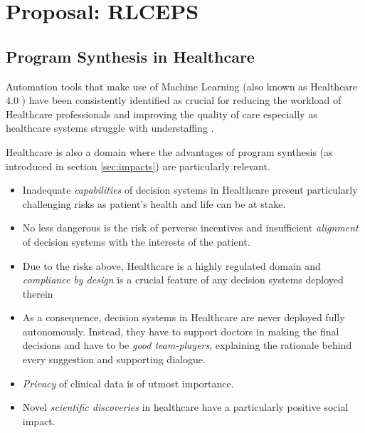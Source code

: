 \chapter{Proposal: RLCEPS}
\label{ch:proposal}

\section{Program Synthesis in Healthcare}
\label{sec:ps-health}

Automation tools that make use of Machine Learning (also known as Healthcare 4.0 \cite{tortorellaHealthcareTrendsChallenges2020}) have been consistently identified as crucial for reducing the workload of Healthcare professionals and improving the quality of care \cite{agrawalMachineLearningHealthcare2020, deviDesignImplementationAdvanced2022, g.kumarSurveyMachineLearning2016, ganguliMachineLearningPursuit2020, maityMachineLearningImproved2017, mitraMachineLearningHealthcare2021, pianykhImprovingHealthcareOperations2020, xhaferraRoleMachineLearning2022} especially as healthcare systems struggle with understaffing \cite{ashleyy.metcalfHospitalUnitUnderstaffing2016,SurveyShowsHidden1993,UnderstaffingSignificantIssue2012,campbellUniversalHealthCoverage2013, hudsonUnderstaffing2015, mercerMessageEditorinChief2008, r.stanleyUnderstaffedOverwhelmed2010, munnUnderstaffingWardsCompromising2017, thelancetHealthcareSystemStaffing2018}.

Healthcare is also a domain where the advantages of program synthesis (as introduced in section \ref{sec:impacts}) are particularly relevant.
\begin{itemize}
    \item Inadequate \emph{capabilities} of decision systems in Healthcare present particularly challenging risks as patient's health and life can be at stake.
    \item No less dangerous is the risk of perverse incentives and insufficient \emph{alignment} of decision systems with the interests of the patient.
    \item Due to the risks above, Healthcare is a highly regulated domain and \emph{compliance by design} is a crucial feature of any decision systems deployed therein
    \item As a consequence, decision systems in Healthcare are never deployed fully autonomously. Instead, they have to support doctors in making the final decisions and have to be \emph{good team-players}, explaining the rationale behind every suggestion and supporting dialogue.
    \item \emph{Privacy} of clinical data is of utmost importance.
    \item Novel \emph{scientific discoveries} in healthcare have a particularly positive social impact.
\end{itemize}

